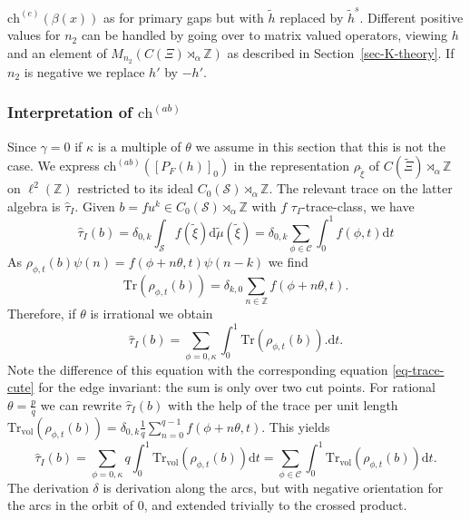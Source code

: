 \documentclass[11pt]{amsart}
\newcommand{\Z}{\mathbb{Z}}
\newcommand{\cut}{\kappa}
\newcommand{\che}{\text{ch}^{(e)}}
\newcommand{\chab}{\text{ch}^{(ab)}}
\newcommand{\p}{p}
\newcommand{\q}{q}
\begin{document}
$\che(\beta(x))$ as for primary gaps but with $\tilde h$ replaced by $\tilde h^s$. 
Different positive values for $n_2$ can be handled by going over to matrix valued operators, viewing $h$ and an element of $M_{n_2}(C(\Xi)\rtimes_\alpha\Z)$ as described in Section~\ref{sec-K-theory}. If $n_2$ is negative we replace $h'$ by $-h'$. 

\subsubsection{Interpretation of $\chab$}
Since $\gamma=0$ if $\cut$ is a multiple of $\theta$ we assume in this section that this is not the case. We express $\chab([P_F(h)]_0)$ in the representation $\rho_{\tilde \xi}$ of $C(\tilde\Xi)\rtimes_\alpha\Z$ on $\ell^2(\Z)$ restricted to its ideal $C_0(\mathcal S)\rtimes_\alpha\Z$. The relevant trace on the latter algebra is $\hat\tau_I$. Given $b = f u^k\in C_0(\mathcal S)\rtimes_\alpha\Z$ with $f$ $\tau_I$-trace-class, we have
$$\hat\tau_I(b) = \delta_{0,k} \int_{\mathcal S} f (\tilde \xi) \mathrm{d}\tilde\mu(\tilde\xi) = 
\delta_{0,k}\sum_{\phi\in \mathcal C} \int_0^1 f(\phi,t) \mathrm{d}t
$$
As $\rho_{\phi,t}(b)\psi(n) = f(\phi+n\theta,t)\psi(n-k)$ we find 
$$\mathrm{Tr}(\rho_{\phi,t}(b)) = \delta_{k,0} \sum_{n\in\Z} f(\phi+n\theta,t) .$$ 
Therefore, if $\theta$ is irrational we obtain
\begin{equation}\label{eq-trace-cutab}
\hat\tau_I(b) =  \sum_{\phi=0,\cut} \int_0^1 \mathrm{Tr}( \rho_{\phi,t}(b)) .\mathrm{d}t .
\end{equation}
Note the difference of this equation with the corresponding equation \eqref{eq-trace-cute} for the edge invariant: the sum is only over two cut points. For rational $\theta = \frac{\p}{\q}$ we can rewrite $\hat\tau_I(b)$ with the help of the trace per unit length $\mathrm{Tr}_{\mathrm{vol}}(\rho_{\phi,t}(b)) = \delta_{0,k} \frac1{\q} \sum_{n=0}^{\q-1} f(\phi+n\theta,t)$. This yields
\begin{equation}\label{eq-trace-cutab-rat}
\hat\tau_I(b) =  \sum_{\phi=0,\cut} \q \int_0^1 \mathrm{Tr}_{\mathrm{vol}}( \rho_{\phi,t}(b)) \mathrm{d}t = \sum_{\phi\in\mathcal C} \int_0^1 \mathrm{Tr}_{\mathrm{vol}}( \rho_{\phi,t}(b)) \mathrm{d}t .
\end{equation}
The derivation
$\delta$ is derivation along the arcs, but with negative orientation for the arcs in the orbit of  $0$, and extended trivially to the crossed product. 
\end{document}
